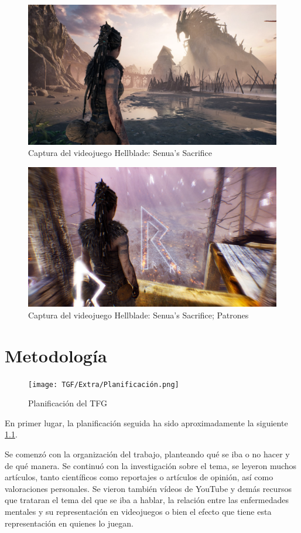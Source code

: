 \documentclass[12pt, a4paper,twoside,titlepage]{book}
\begin{document}
\begin{figure}
    \centering
    \includegraphics[width=.8\linewidth]{Imagenes videojuegos/hellblade.jpg}
    \caption{Captura del videojuego Hellblade: Senua's Sacrifice}
    \label{fig:hellblade}
\end{figure}
\begin{figure}
    \centering
    \includegraphics[width=.8\linewidth]{Imagenes videojuegos/hellblade2.jpg}
    \caption{Captura del videojuego Hellblade: Senua's Sacrifice; Patrones}
    \label{fig:hellblade2}
\end{figure}

\chapter{Metodología}


\begin{figure}
	\centering
	\texttt{[image: TGF/Extra/Planificación.png]}
	\caption{Planificación del TFG}
	\label{fig:planificacion}
\end{figure}


En primer lugar, la planificación seguida ha sido aproximadamente la siguiente \ref{fig:planificacion}. 

Se comenzó con la organización del trabajo, planteando qué se iba o no hacer y de qué manera. Se continuó con la investigación sobre el tema, se leyeron muchos artículos, tanto científicos como reportajes o artículos de opinión, así como valoraciones personales. Se vieron también vídeos de YouTube y demás recursos que trataran el tema del que se iba a hablar, la relación entre las enfermedades mentales y su representación en videojuegos o bien el efecto que tiene esta representación en quienes lo juegan. 
\end{document}
